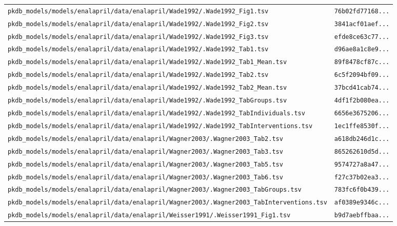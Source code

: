 \documentclass{article}
\begin{document}
\begin{longtable}{ll}
\texttt{pkdb\_models/models/enalapril/data/enalapril/Wade1992/.Wade1992\_Fig1.tsv} & \texttt{76b02fd77168...} \\
\texttt{pkdb\_models/models/enalapril/data/enalapril/Wade1992/.Wade1992\_Fig2.tsv} & \texttt{3841acf01aef...} \\
\texttt{pkdb\_models/models/enalapril/data/enalapril/Wade1992/.Wade1992\_Fig3.tsv} & \texttt{efde8ce63c77...} \\
\texttt{pkdb\_models/models/enalapril/data/enalapril/Wade1992/.Wade1992\_Tab1.tsv} & \texttt{d96ae8a1c8e9...} \\
\texttt{pkdb\_models/models/enalapril/data/enalapril/Wade1992/.Wade1992\_Tab1\_Mean.tsv} & \texttt{89f8478cf87c...} \\
\texttt{pkdb\_models/models/enalapril/data/enalapril/Wade1992/.Wade1992\_Tab2.tsv} & \texttt{6c5f2094bf09...} \\
\texttt{pkdb\_models/models/enalapril/data/enalapril/Wade1992/.Wade1992\_Tab2\_Mean.tsv} & \texttt{37bcd41cab74...} \\
\texttt{pkdb\_models/models/enalapril/data/enalapril/Wade1992/.Wade1992\_TabGroups.tsv} & \texttt{4df1f2b080ea...} \\
\texttt{pkdb\_models/models/enalapril/data/enalapril/Wade1992/.Wade1992\_TabIndividuals.tsv} & \texttt{6656e3675206...} \\
\texttt{pkdb\_models/models/enalapril/data/enalapril/Wade1992/.Wade1992\_TabInterventions.tsv} & \texttt{1ec1ffe8530f...} \\
\texttt{pkdb\_models/models/enalapril/data/enalapril/Wagner2003/.Wagner2003\_Tab2.tsv} & \texttt{a618db246d1c...} \\
\texttt{pkdb\_models/models/enalapril/data/enalapril/Wagner2003/.Wagner2003\_Tab3.tsv} & \texttt{865262610d5d...} \\
\texttt{pkdb\_models/models/enalapril/data/enalapril/Wagner2003/.Wagner2003\_Tab5.tsv} & \texttt{9574727a8a47...} \\
\texttt{pkdb\_models/models/enalapril/data/enalapril/Wagner2003/.Wagner2003\_Tab6.tsv} & \texttt{f27c37b02ea3...} \\
\texttt{pkdb\_models/models/enalapril/data/enalapril/Wagner2003/.Wagner2003\_TabGroups.tsv} & \texttt{783fc6f0b439...} \\
\texttt{pkdb\_models/models/enalapril/data/enalapril/Wagner2003/.Wagner2003\_TabInterventions.tsv} & \texttt{af0389e9346c...} \\
\texttt{pkdb\_models/models/enalapril/data/enalapril/Weisser1991/.Weisser1991\_Fig1.tsv} & \texttt{b9d7aebffbaa...} \\

\end{longtable}
\end{document}
